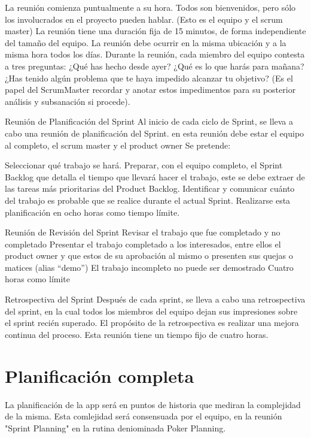 \documentclass[../pfc.tex]{subfiles}
\begin{document}
	La reunión comienza puntualmente a su hora.
	Todos son bienvenidos, pero sólo los involucrados en el proyecto pueden hablar. (Esto es el equipo y el scrum master)
	La reunión tiene una duración fija de 15 minutos, de forma independiente del tamaño del equipo.
	La reunión debe ocurrir en la misma ubicación y a la misma hora todos los días.
	Durante la reunión, cada miembro del equipo contesta a tres preguntas:
	¿Qué has hecho desde ayer?
	¿Qué es lo que harás para mañana?
	¿Has tenido algún problema que te haya impedido alcanzar tu objetivo? (Es el papel del ScrumMaster recordar y anotar estos impedimentos para su posterior análisis y subsanación si procede).
	
	Reunión de Planificación del Sprint 
	Al inicio de cada ciclo de Sprint, se lleva a cabo una reunión de planificación del Sprint. en esta reunión debe estar el equipo al completo, el scrum master y el product owner Se pretende:
	
	Seleccionar qué trabajo se hará.
	Preparar, con el equipo completo, el Sprint Backlog que detalla el tiempo que llevará hacer el trabajo, este se debe extraer de las tareas más prioritarias del Product Backlog. 
	Identificar y comunicar cuánto del trabajo es probable que se realice durante el actual Sprint.
	Realizarse esta planificación en ocho horas como tiempo límite.
	
	Reunión de Revisión del Sprint
	Revisar el trabajo que fue completado y no completado
	Presentar el trabajo completado a los interesados, entre ellos el product owner y que estos de su aprobación al mismo o presenten sus quejas o matices (alias “demo”)
	El trabajo incompleto no puede ser demostrado
	Cuatro horas como límite
	
	Retrospectiva del Sprint 
	Después de cada sprint, se lleva a cabo una retrospectiva del sprint, en la cual todos los miembros del equipo dejan sus impresiones sobre el sprint recién superado. El propósito de la retrospectiva es realizar una mejora continua del proceso. Esta reunión tiene un tiempo fijo de cuatro horas.
	
	\section{Planificación completa}
	
	La planificación de la app será en puntos de historia que mediran la complejidad de la misma. Esta comlejidad será consensuada por el equipo, en la reunión "Sprint Planning" en la rutina deniominada Poker Planning.  
	
\end{document}

